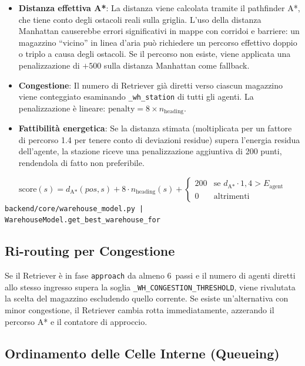 \begin{itemize}
    \item \textbf{Distanza effettiva A*}: La distanza viene calcolata tramite il pathfinder
          A*, che tiene conto degli ostacoli reali sulla griglia. L'uso della distanza
          Manhattan causerebbe errori significativi in mappe con corridoi e barriere: un
          magazzino ``vicino'' in linea d'aria pu\`o richiedere un percorso effettivo
          doppio o triplo a causa degli ostacoli. Se il percorso non esiste, viene applicata
          una penalizzazione di $+500$ sulla distanza Manhattan come fallback.
    \item \textbf{Congestione}: Il numero di Retriever già diretti verso ciascun magazzino
          viene conteggiato esaminando \texttt{\_wh\_station} di tutti gli agenti. La
          penalizzazione \`e lineare: $\text{penalty} = 8 \times n_{\text{heading}}$.
    \item \textbf{Fattibilit\`a energetica}: Se la distanza stimata (moltiplicata per un
          fattore di percorso 1.4 per tenere conto di deviazioni residue) supera l'energia
          residua dell'agente, la stazione riceve una penalizzazione aggiuntiva di 200 punti,
          rendendola di fatto non preferibile.
\end{itemize}

$$\text{score}(s) = d_{\text{A*}}(pos, s) + 8 \cdot n_{\text{heading}}(s) + \begin{cases} 200 & \text{se } d_{\text{A*}} \cdot 1{,}4 > E_{\text{agent}} \\ 0 & \text{altrimenti} \end{cases}$$
\noindent\hfill{\footnotesize\texttt{backend/core/warehouse\_model.py | WarehouseModel.get\_best\_warehouse\_for}}

\subsection{Ri-routing per Congestione}

Se il Retriever \`e in fase \texttt{approach} da almeno 6~passi e il numero di agenti
diretti allo stesso ingresso supera la soglia \texttt{\_WH\_CONGESTION\_THRESHOLD},
viene rivalutata la scelta del magazzino escludendo quello corrente. Se esiste
un'alternativa con minor congestione, il Retriever cambia rotta immediatamente,
azzerando il percorso A* e il contatore di approccio.

\subsection{Ordinamento delle Celle Interne (Queueing)}

